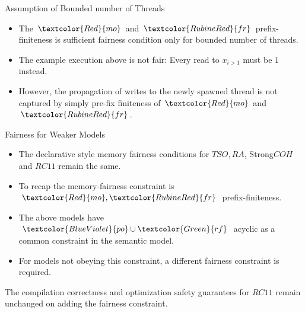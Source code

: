 \documentclass[dvipsnames, notes]{beamer}
\newcommand{\po}{\textcolor{BlueViolet}{po}}
\newcommand{\rf}{\textcolor{Green}{rf}}
\newcommand{\fr}{\textcolor{RubineRed}{fr}}
\newcommand{\mo}{\textcolor{Red}{mo}}
\begin{document}
    \begin{frame}{Assumption of Bounded number of Threads}
      \begin{figure}
      \end{figure}

      \begin{itemize}
        \item The $\mo$ and $\fr$ prefix-finiteness is sufficient fairness condition only for bounded number of threads.
        \item The example execution above is not fair: Every read to $x_{i>1}$ must be $1$ instead. 
        \item However, the propagation of writes to the newly spawned thread is not captured by simply pre-fix finiteness of $\mo$ and $\fr$. 
      \end{itemize}

    \end{frame}

    \begin{frame}{Fairness for Weaker Models}

      \begin{itemize}
        \item The declarative style memory fairness conditions for $TSO, RA$, Strong$COH$ and $RC11$ remain the same.
        \item To recap the memory-fairness constraint is $\mo, \fr$ prefix-finiteness.
        \item The above models have $\po \cup \rf$ acyclic as a common constraint in the semantic model.
        \item For models not obeying this constraint, a different fairness constraint is required.
      \end{itemize}
      
      \begin{center}
        The compilation correctness and optimization safety guarantees for $RC11$ remain unchanged on adding the fairness constraint.
      \end{center}

    \end{frame}
\end{document}
